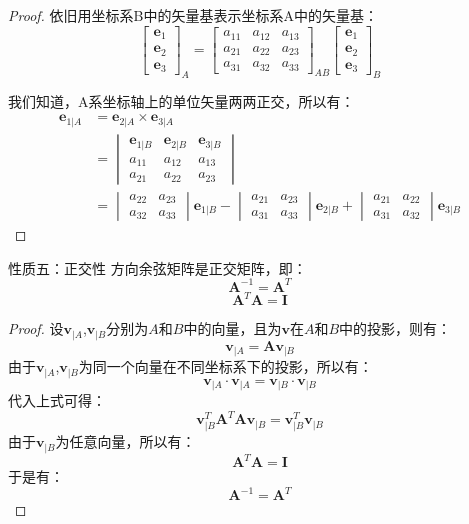 \begin{proof}
    依旧用坐标系B中的矢量基表示坐标系A中的矢量基：
     $$\begin{bmatrix}\bm{e}_{1}\\\bm{e}_{2}\\\bm{e}_{3}\end{bmatrix}_A=\begin{bmatrix}a_{11}&a_{12}&a_{13}\\a_{21}&a_{22}&a_{23}\\a_{31}&a_{32}&a_{33}\end{bmatrix}_{AB}\begin{bmatrix}\bm{e}_{1}\\\bm{e}_{2}\\\bm{e}_{3}\end{bmatrix}_B$$

     我们知道，A系坐标轴上的单位矢量两两正交，所以有：
    \begin{equation}
    \begin{aligned}
        \bm{e}_{1|A}&=\bm{e}_{2|A}\times\bm{e}_{3|A}\\
        &=\begin{vmatrix}\bm{e}_{1|B}&\bm{e}_{2|B}&\bm{e}_{3|B}\\a_{11}&a_{12}&a_{13}\\a_{21}&a_{22}&a_{23}\end{vmatrix}\\
        &=\begin{vmatrix}a_{22}&a_{23}\\a_{32}&a_{33}\end{vmatrix}\bm{e}_{1|B}-\begin{vmatrix}a_{21}&a_{23}\\a_{31}&a_{33}\end{vmatrix}\bm{e}_{2|B}+\begin{vmatrix}a_{21}&a_{22}\\a_{31}&a_{32}\end{vmatrix}\bm{e}_{3|B}
    \end{aligned}
    \end{equation}

\end{proof}


\begin{myTheorem}{性质五：正交性}
    方向余弦矩阵是正交矩阵，即：
$$\bm{A}^{-1} = \bm{A}^{T}$$
        $$\bm{A}^{T}\bm{A}=\bm{I}$$

\end{myTheorem}
\begin{proof}
    设$\mathbf{v}_{|A}$,$\mathbf{v}_{|B}$分别为$A$和$B$中的向量，且为$\mathbf{v}$在$A$和$B$中的投影，则有：
$$\mathbf{v}_{|A}=\bm{A}\mathbf{v}_{|B}$$
    由于$\mathbf{v}_{|A}$,$\mathbf{v}_{|B}$为同一个向量在不同坐标系下的投影，所以有：
$$\mathbf{v}_{|A}\cdot\mathbf{v}_{|A}=\mathbf{v}_{|B}\cdot\mathbf{v}_{|B}$$
    代入上式可得：
$$\mathbf{v}_{|B}^{T}\bm{A}^{T}\bm{A}\mathbf{v}_{|B}=\mathbf{v}_{|B}^{T}\mathbf{v}_{|B}$$
    由于$\mathbf{v}_{|B}$为任意向量，所以有：
$$\bm{A}^{T}\bm{A}=\bm{I}$$
    于是有：
$$\bm{A}^{-1} = \bm{A}^{T}$$
\end{proof}

